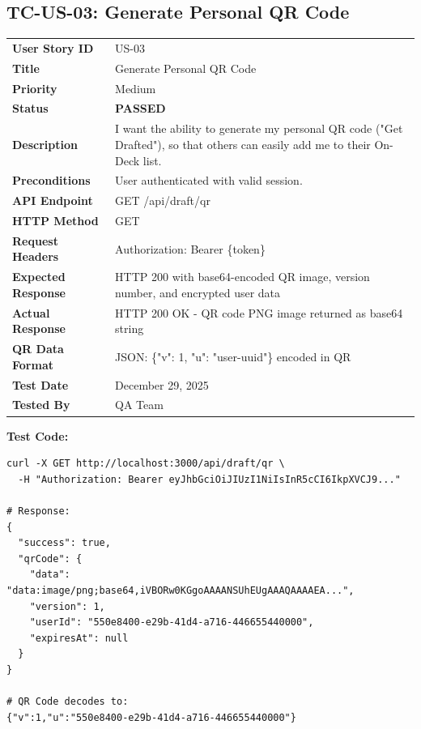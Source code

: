 \documentclass[11pt,a4paper]{article}
\newcommand{\passed}{\textcolor{pass}{\textbf{PASSED}}}
\begin{document}
\vspace{0.5cm}


\subsection{TC-US-03: Generate Personal QR Code}

\begin{tabularx}{\textwidth}{|p{3.2cm}|Y|}
\hline
{}
 \\
\hline
\textbf{User Story ID} & US-03 \\
\hline
\textbf{Title} & Generate Personal QR Code \\
\hline
\textbf{Priority} & Medium \\
\hline
\textbf{Status} & \passed \\
\hline
\textbf{Description} & I want the ability to generate my personal QR code ("Get Drafted"), so that others can easily add me to their On-Deck list. \\
\hline
\textbf{Preconditions} & User authenticated with valid session. \\
\hline
\textbf{API Endpoint} & GET /api/draft/qr \\
\hline
\textbf{HTTP Method} & GET \\
\hline
\textbf{Request Headers} & Authorization: Bearer \{token\} \\
\hline
\textbf{Expected Response} & HTTP 200 with base64-encoded QR image, version number, and encrypted user data \\
\hline
\textbf{Actual Response} & HTTP 200 OK - QR code PNG image returned as base64 string \\
\hline
\textbf{QR Data Format} & JSON: \{"v": 1, "u": "user-uuid"\} encoded in QR \\
\hline
\textbf{Test Date} & December 29, 2025 \\
\hline
\textbf{Tested By} & QA Team \\
\hline
\end{tabularx}

\vspace{0.3cm}
\textbf{Test Code:}
\begin{lstlisting}
curl -X GET http://localhost:3000/api/draft/qr \
  -H "Authorization: Bearer eyJhbGciOiJIUzI1NiIsInR5cCI6IkpXVCJ9..."

# Response:
{
  "success": true,
  "qrCode": {
    "data": "data:image/png;base64,iVBORw0KGgoAAAANSUhEUgAAAQAAAAEA...",
    "version": 1,
    "userId": "550e8400-e29b-41d4-a716-446655440000",
    "expiresAt": null
  }
}

# QR Code decodes to:
{"v":1,"u":"550e8400-e29b-41d4-a716-446655440000"}
\end{lstlisting}
\end{document}
